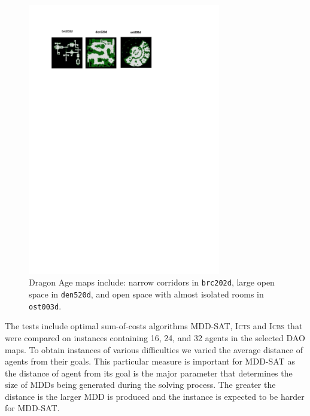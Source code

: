 \documentclass[jair,oneside,11pt]{article}
\begin{document}
\begin{figure}[h]
\centering
\includegraphics[trim={2.5cm 22.0cm 7cm 2.7cm},clip,width=0.75\textwidth]{fig_maps.pdf}
\vspace{-0.4cm}\caption{Dragon Age maps  include: narrow corridors in \texttt{brc202d}, large open space in \texttt{den520d}, and open space with almost isolated rooms in \texttt{ost003d}.} \label{figure-maps}
\end{figure}

The tests include optimal sum-of-costs algorithms  MDD-SAT, \textsc{Icts} and \textsc{Icbs} that were compared on instances containing 16, 24, and 32 agents in the selected DAO maps. To obtain instances of various difficulties we varied the average distance of agents from their goals. This particular measure is important for MDD-SAT as the distance of agent from its goal is the major parameter that determines the size of MDDs being generated during the solving process. The greater the distance is the larger MDD is produced and the instance is expected to be harder for MDD-SAT.
\end{document}
